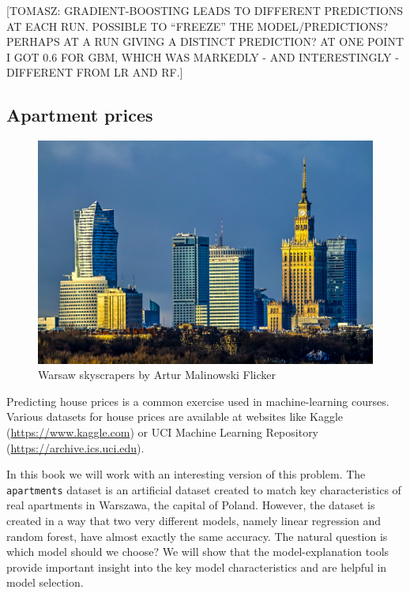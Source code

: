\documentclass[12pt,]{krantz}
\theoremstyle{definition}
\theoremstyle{definition}
\theoremstyle{definition}
\theoremstyle{remark}
\begin{document}
{[}TOMASZ: GRADIENT-BOOSTING LEADS TO DIFFERENT PREDICTIONS AT EACH RUN.
POSSIBLE TO ``FREEZE'' THE MODEL/PREDICTIONS? PERHAPS AT A RUN GIVING A
DISTINCT PREDICTION? AT ONE POINT I GOT 0.6 FOR GBM, WHICH WAS MARKEDLY
- AND INTERESTINGLY - DIFFERENT FROM LR AND RF.{]}

\hypertarget{ApartmentDataset}{%
\subsection{Apartment prices}\label{ApartmentDataset}}

\begin{figure}
\centering
\includegraphics{figure/am1974_flicker.jpg}
\caption{Warsaw skyscrapers by Artur Malinowski Flicker}
\end{figure}

Predicting house prices is a common exercise used in machine-learning
courses. Various datasets for house prices are available at websites
like Kaggle (\url{https://www.kaggle.com}) or UCI Machine Learning
Repository (\url{https://archive.ics.uci.edu}).

In this book we will work with an interesting version of this problem.
The \texttt{apartments} dataset is an artificial dataset created to
match key characteristics of real apartments in Warszawa, the capital of
Poland. However, the dataset is created in a way that two very different
models, namely linear regression and random forest, have almost exactly
the same accuracy. The natural question is which model should we choose?
We will show that the model-explanation tools provide important insight
into the key model characteristics and are helpful in model selection.
\end{document}
